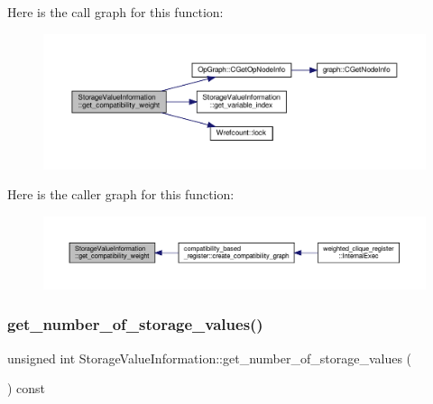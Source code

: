Here is the call graph for this function\+:
\nopagebreak
\begin{figure}[H]
\begin{center}
\leavevmode
\includegraphics[width=350pt]{d8/dbe/classStorageValueInformation_a7ed7b636cee9a94fcfeecab58c73f2bc_cgraph}
\end{center}
\end{figure}
Here is the caller graph for this function\+:
\nopagebreak
\begin{figure}[H]
\begin{center}
\leavevmode
\includegraphics[width=350pt]{d8/dbe/classStorageValueInformation_a7ed7b636cee9a94fcfeecab58c73f2bc_icgraph}
\end{center}
\end{figure}
\mbox{\label{classStorageValueInformation_a5ccb95e3ac0776910f8967099f46a679}} 
\subsubsection{\texorpdfstring{get\+\_\+number\+\_\+of\+\_\+storage\+\_\+values()}{get\_number\_of\_storage\_values()}}
{\footnotesize\ttfamily unsigned int Storage\+Value\+Information\+::get\+\_\+number\+\_\+of\+\_\+storage\+\_\+values (\begin{DoxyParamCaption}{ }\end{DoxyParamCaption}) const}




